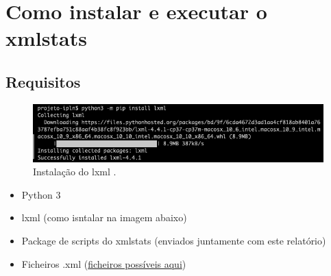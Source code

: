 \documentclass[11pt,a4paper]{report}%
\begin{document}
\chapter{Como instalar e executar o xmlstats}
\section{Requisitos}
\begin{figure}[h]
	\centering
	\includegraphics[scale=0.6]{lxml.png}
	\caption{Instalação do lxml .}
	\label{img:pag}
\end{figure}
\begin{itemize}
    \item Python 3
    \item lxml (como isntalar na imagem abaixo)
    \item Package de scripts do xmlstats (enviados juntamente com este relatório)
    \item Ficheiros .xml (\href{https://archive.org/download/stackexchange}{ficheiros possíveis aqui})
\end{itemize}{}
\end{document}
